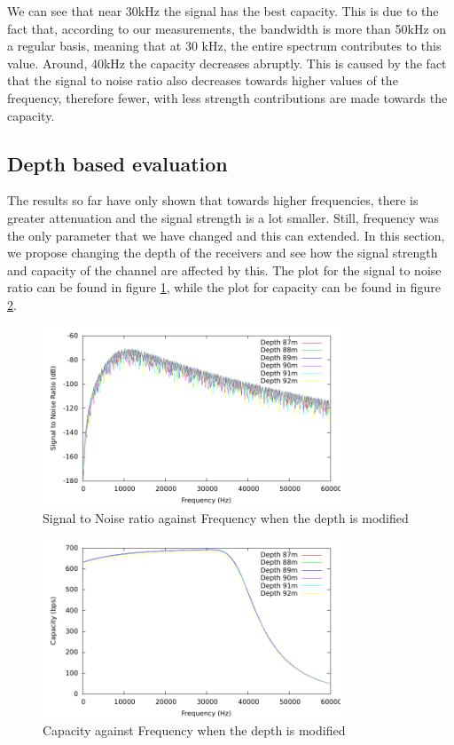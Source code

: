 \documentclass[a4paper]{IEEEtran}
\begin{document}
We can see that near 30kHz the signal has the best capacity. This is
due to the fact that, according to our measurements, the bandwidth is
more than 50kHz on a regular basis, meaning that at 30 kHz, the entire
spectrum contributes to this value. Around, 40kHz the capacity
decreases abruptly. This is caused by the fact that the signal to
noise ratio also decreases towards higher values of the frequency,
therefore fewer, with less strength contributions are made towards the capacity.



\subsection{Depth based evaluation}
\label{subsec:depth}
The results so far have only shown that towards higher frequencies,
there is greater attenuation and the signal strength is a lot
smaller. Still, frequency was the only parameter that we have changed
and this can extended. In this section, we propose changing the depth
of the receivers and see how the signal strength and capacity of the
channel are affected by this. The plot for the signal to noise ratio
can be found in figure \ref{fig:sig2noiseDepth}, while the plot for
capacity can be found in figure \ref{fig:capDepth}.

\begin{figure}[ht]
  \centering
  \includegraphics[width=3.5in]{../postprocessing/sig2noiseDepth.pdf}
  \caption{\small{Signal to Noise ratio against Frequency when the
      depth is modified}}
  \label{fig:sig2noiseDepth}
\end{figure}

\begin{figure}[ht]
  \centering
  \includegraphics[width=3.5in]{../postprocessing/capacityDepth.pdf}
  \caption{\small{Capacity against Frequency when the depth is
    modified}}
\label{fig:capDepth}
\end{figure}
\end{document}
